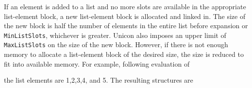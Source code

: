 If an element is added to a list and no more slots are available in the
appropriate list-element block, a new list-element block is allocated and
linked in. The size of the new block is half the number of elements in the
entire list before expansion or \texttt{MinListSlots}, whichever is
greater.
{\color{blue} Unicon also imposes an upper limit of \texttt{MaxListSlots}
on the size of the new block.}
However, if there is not enough memory to allocate a list-element
block of the desired size, the size is reduced to fit into available
memory. For example, following evaluation of



\noindent the list elements are 1,2,3,4, and 5. The resulting structures are


